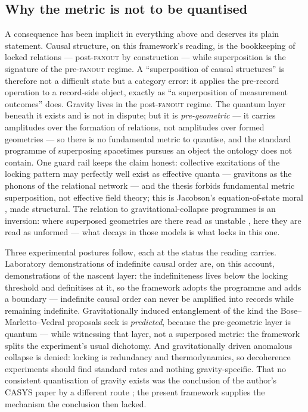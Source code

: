 \subsection{Why the metric is not to be quantised}\label{sec:no-quantised-gravity}

A consequence has been implicit in everything above and deserves its plain statement. Causal
structure, on this framework's reading, is the bookkeeping of locked relations --- post-\textsc{fanout}
by construction --- while superposition is the signature of the pre-\textsc{fanout} regime. A
``superposition of causal structures'' is therefore not a difficult state but a category error: it
applies the pre-record operation to a record-side object, exactly as ``a superposition of
measurement outcomes'' does. Gravity lives in the post-\textsc{fanout} regime. The quantum layer
beneath it exists and is not in dispute; but it is \emph{pre-geometric} --- it carries amplitudes
over the formation of relations, not amplitudes over formed geometries --- so there is no
fundamental metric to quantise, and the standard programme of superposing spacetimes pursues an
object the ontology does not contain. One guard rail keeps the claim honest: collective
excitations of the locking pattern may perfectly well exist as effective quanta --- gravitons as
the phonons of the relational network --- and the thesis forbids fundamental metric superposition,
not effective field theory; this is Jacobson's equation-of-state moral \autocite{Jacobson1995},
made structural. The relation to gravitational-collapse programmes is an inversion: where
superposed geometries are there read as unstable \autocite{Penrose1996}, here they are read as
unformed --- what decays in those models is what locks in this one.

Three experimental postures follow, each at the status the reading carries. Laboratory
demonstrations of indefinite causal order \autocite{procopio2015experimental, rubino2017indefinite} are, on this
account, demonstrations of the nascent layer: the indefiniteness lives below the locking threshold
and definitises at it, so the framework adopts the programme and adds a boundary --- indefinite
causal order can never be amplified into records while remaining indefinite. Gravitationally
induced entanglement of the kind the Bose--Marletto--Vedral proposals seek
\autocite{bose2017spin, marlettovedral2017gravitationally} is \emph{predicted}, because the
pre-geometric layer is quantum --- while witnessing that layer, not a superposed metric: the
framework splits the experiment's usual dichotomy. And gravitationally driven anomalous collapse
is denied: locking is redundancy and thermodynamics, so decoherence experiments should find
standard rates and nothing gravity-specific. That no consistent quantisation of gravity exists was
the conclusion of the author's CASYS paper by a different route \autocite{small_2006}; the present
framework supplies the mechanism the conclusion then lacked.

